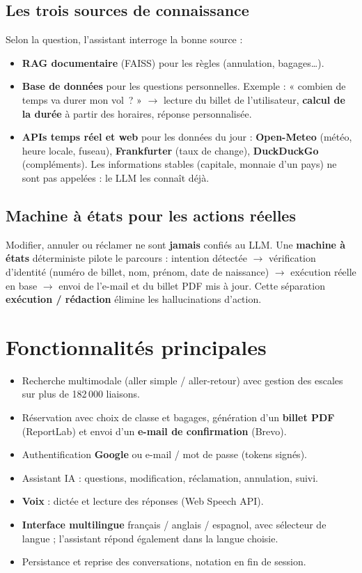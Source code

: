 \documentclass[11pt,a4paper]{article}
\begin{document}
\subsection{Les trois sources de connaissance}
Selon la question, l'assistant interroge la bonne source :
\begin{itemize}[nosep]
  \item \textbf{RAG documentaire} (FAISS) pour les règles (annulation, bagages\dots).
  \item \textbf{Base de données} pour les questions personnelles. Exemple :
        « combien de temps va durer mon vol~? » $\rightarrow$ lecture du billet de
        l'utilisateur, \textbf{calcul de la durée} à partir des horaires, réponse
        personnalisée.
  \item \textbf{APIs temps réel et web} pour les données du jour : \textbf{Open-Meteo}
        (météo, heure locale, fuseau), \textbf{Frankfurter} (taux de change),
        \textbf{DuckDuckGo} (compléments). Les informations stables (capitale, monnaie
        d'un pays) ne sont pas appelées : le LLM les connaît déjà.
\end{itemize}

\subsection{Machine à états pour les actions réelles}
Modifier, annuler ou réclamer ne sont \textbf{jamais} confiés au LLM. Une
\textbf{machine à états} déterministe pilote le parcours : intention détectée
$\rightarrow$ vérification d'identité (numéro de billet, nom, prénom, date de
naissance) $\rightarrow$ exécution réelle en base $\rightarrow$ envoi de l'e-mail et du
billet PDF mis à jour. Cette séparation \textbf{exécution / rédaction} élimine les
hallucinations d'action.

\section{Fonctionnalités principales}
\begin{itemize}[nosep]
  \item Recherche multimodale (aller simple / aller-retour) avec gestion des escales
        sur plus de 182\,000 liaisons.
  \item Réservation avec choix de classe et bagages, génération d'un \textbf{billet
        PDF} (ReportLab) et envoi d'un \textbf{e-mail de confirmation} (Brevo).
  \item Authentification \textbf{Google} ou e-mail / mot de passe (tokens signés).
  \item Assistant IA : questions, modification, réclamation, annulation, suivi.
  \item \textbf{Voix} : dictée et lecture des réponses (Web Speech API).
  \item \textbf{Interface multilingue} français / anglais / espagnol, avec sélecteur de
        langue ; l'assistant répond également dans la langue choisie.
  \item Persistance et reprise des conversations, notation en fin de session.
\end{itemize}
\end{document}
